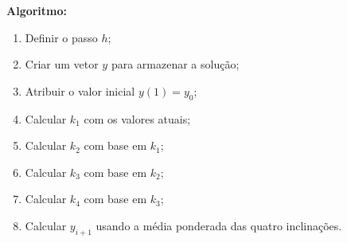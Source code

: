 \textbf{Algoritmo:}
\begin{enumerate}
    \item Definir o passo $h$;
    \item Criar um vetor $y$ para armazenar a solução;
    \item Atribuir o valor inicial $y(1) = y_0$;
    \item Calcular $k_1$ com os valores atuais;
    \item Calcular $k_2$ com base em $k_1$;
    \item Calcular $k_3$ com base em $k_2$;
    \item Calcular $k_4$ com base em $k_3$;
    \item Calcular $y_{i+1}$ usando a média ponderada das quatro inclinações.
\end{enumerate}
